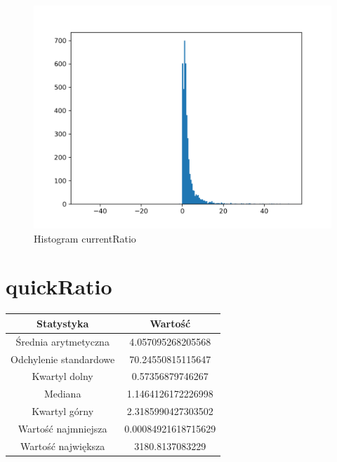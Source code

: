 \documentclass{article}
\begin{document}
\begin{figure}[h!]
    \includegraphics[width=\linewidth]{variables/currentRatio.png}
    \caption{Histogram currentRatio }
\end{figure}\section{ quickRatio }

\begin{center}
    \begin{tabular}{|c | c|} 
    \hline
    Statystyka & Wartość \\
    \hline\hline
    Średnia arytmetyczna & 4.057095268205568 \\ 
    \hline
    Odchylenie standardowe & 70.24550815115647 \\
    \hline
    Kwartyl dolny & 0.57356879746267 \\
    \hline
    Mediana & 1.1464126172226998 \\
    \hline
    Kwartyl górny & 2.3185990427303502 \\
    \hline
    Wartość najmniejsza & 0.00084921618715629 \\
    \hline
    Wartość największa & 3180.8137083229 \\
    \hline
   \end{tabular}
\end{center}
\end{document}
